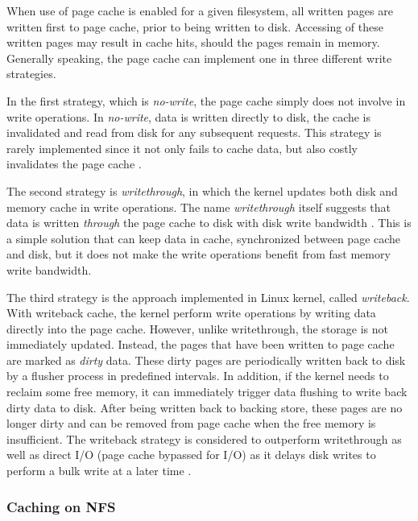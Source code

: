 When use of page cache is enabled for a given filesystem, all written pages 
are written first to page cache, prior to being written to disk.
Accessing of these written pages may result in cache hits, should the pages 
remain in memory.
Generally speaking, the page cache can implement one in three 
different write strategies.

In the first strategy, which is \textit{no-write}, the page cache simply 
does not involve in write operations. In \textit{no-write}, data is written 
directly to disk, the cache is invalidated and read from disk for any 
subsequent requests. 
This strategy is rarely implemented since it not only fails to cache data, 
but also costly invalidates the page cache \cite{linuxdev3rd2010}.

The second strategy is \textit{writethrough}, in which the kernel updates both 
disk and memory cache in write operations. The name \textit{writethrough} 
itself suggests that data is written \textit{through} the page cache to disk 
with disk write bandwidth \cite{linuxdev3rd2010}.
This is a simple solution that can keep data in cache, synchronized 
between page cache and disk, but it does not make the write operations 
benefit from fast memory write bandwidth. 

The third strategy is the approach implemented in Linux kernel, 
called \textit{writeback}. 
With writeback cache, the kernel perform write operations by writing data 
directly into the page cache. However, unlike writethrough, the storage is not 
immediately updated. Instead, the pages that have been written to page cache 
are marked as \textit{dirty} data. These dirty pages are periodically written 
back to disk by a flusher process in predefined intervals. 
In addition, if the kernel needs to reclaim some free memory, it can 
immediately trigger data flushing to write back dirty data to disk. 
After being written back to backing store, these pages are no longer dirty 
and can be removed from page cache when the free memory is insufficient.
The writeback strategy is considered to outperform writethrough as well as
direct I/O (page cache bypassed for I/O) as it delays disk writes to perform 
a bulk write at a later time \cite{linuxdev3rd2010}.

\subsubsection{Caching on NFS}


